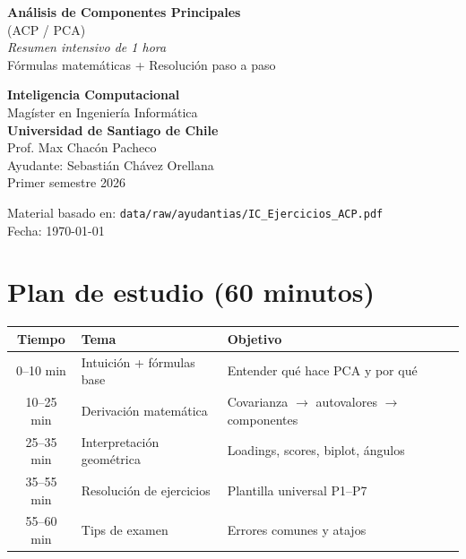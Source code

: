 \documentclass[11pt,a4paper]{article}
\begin{document}
\begin{titlepage}
\centering
\vspace*{2cm}
{\Huge\bfseries\color{usachdark} Análisis de Componentes Principales\\[0.4cm]}
{\LARGE\color{usachteal} (ACP / PCA)}\\[1.5cm]
{\Large\textit{Resumen intensivo de 1 hora}}\\[0.5cm]
{\large Fórmulas matemáticas + Resolución paso a paso}\\[2.5cm]
\begin{tcolorbox}[width=0.7\textwidth,colback=usachteal!10,colframe=usachteal!70!black]
\centering
\textbf{Inteligencia Computacional}\\
Magíster en Ingeniería Informática\\
\textbf{Universidad de Santiago de Chile}\\[0.3cm]
Prof. Max Chacón Pacheco\\
Ayudante: Sebastián Chávez Orellana\\
Primer semestre 2026
\end{tcolorbox}
\vfill
{\small Material basado en: \texttt{data/raw/ayudantias/IC\_Ejercicios\_ACP.pdf}}\\
{\small Fecha: \today}
\end{titlepage}

\tableofcontents
\newpage

\section{Plan de estudio (60 minutos)}

\begin{center}
\begin{tabular}{@{}cll@{}}
\toprule
\textbf{Tiempo} & \textbf{Tema} & \textbf{Objetivo} \\
\midrule
0--10 min  & Intuición + fórmulas base & Entender qué hace PCA y por qué \\
10--25 min & Derivación matemática     & Covarianza $\to$ autovalores $\to$ componentes \\
25--35 min & Interpretación geométrica & Loadings, scores, biplot, ángulos \\
35--55 min & Resolución de ejercicios  & Plantilla universal P1--P7 \\
55--60 min & Tips de examen            & Errores comunes y atajos \\
\bottomrule
\end{tabular}
\end{center}
\end{document}
